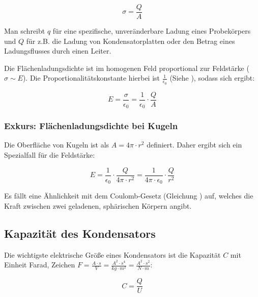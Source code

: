 \begin{equation} \label{eq:flaechenladungsdichte}
	\sigma = \frac{Q}{A}
\end{equation}

\begin{NiceToKnow}
Man schreibt $q$ für eine spezifische, unveränderbare Ladung eines Probekörpers und $Q$ für z.B. die Ladung von Kondensatorplatten oder den Betrag eines Ladungsflusses durch einen Leiter.
\end{NiceToKnow}

Die Flächenladungsdichte ist im homogenen Feld proportional zur Feldstärke ($\sigma \sim E$). Die Proportionalitätskonstante hierbei ist $\frac{1}{\epsilon_0}$ (Siehe ), sodass sich ergibt:

\begin{equation} \label{eq:feldstaerke_mit_sigma}
	E = \frac{\sigma}{\epsilon_0} = \frac{1}{\epsilon_0} \cdot \frac{Q}{A}
\end{equation}

\subsubsection{Exkurs: Flächenladungsdichte bei Kugeln}

Die Oberfläche von Kugeln ist als $A=4\pi \cdot r^2$ definiert. Daher ergibt sich ein Spezialfall für die Feldstärke:

\begin{equation} \label{eq:feldstaerke_kugel}
	E = \frac{1}{\epsilon_0} \cdot \frac{Q}{4\pi \cdot r^2} = \frac{1}{4\pi \cdot \epsilon_0} \cdot \frac{Q}{r^2}
\end{equation}

Es fällt eine Ähnlichkeit mit dem Coulomb-Gesetz (Gleichung ) auf, welches die Kraft zwischen zwei geladenen, sphärischen Körpern angibt.


\subsection{Kapazität des Kondensators}

Die wichtigste elektrische Größe eines Kondensators ist die Kapazität $C$ mit Einheit \glqq Farad\grqq{}, Zeichen $F = \frac{A \cdot s}{V} = \frac{A^2 \cdot s^4}{kg \cdot m^2} = \frac{A^2 \cdot s^2}{N \cdot m}$:

\begin{equation} \label{eq:kapazitaet}
	C = \frac{Q}{U}
\end{equation}

